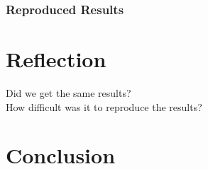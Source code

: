 \documentclass{article} %
\begin{document}
\subsubsection{Reproduced Results}



\vspace{5mm}

\section{Reflection}

Did we get the same results?\\
How difficult was it to reproduce the results?

\vspace{5mm}

\section{Conclusion}



\vspace{5mm}
\end{document}

